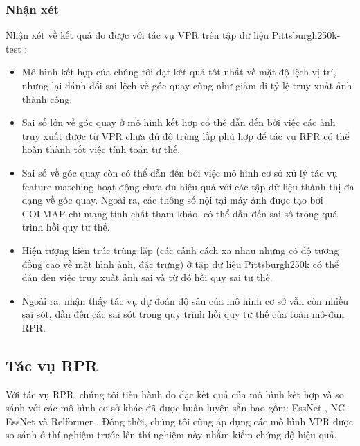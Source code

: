 \subsubsection*{Nhận xét}
Nhận xét về kết quả đo được với tác vụ VPR trên tập dữ liệu Pittsburgh250k-test \cite{6618963}:
\begin{itemize}
	\item Mô hình kết hợp của chúng tôi đạt kết quả tốt nhất về mặt độ lệch vị trí, nhưng lại đánh đổi sai lệch về góc quay cũng như giảm đi tỷ lệ truy xuất ảnh thành công.
	\item Sai số lớn về góc quay ở mô hình kết hợp có thể dẫn đến bởi việc các ảnh truy xuất được từ VPR chưa đủ độ trùng lắp phù hợp để tác vụ RPR có thể hoàn thành tốt việc tính toán tư thế.
	\item Sai số về góc quay còn có thể dẫn đến bởi việc mô hình cơ sở xử lý tác vụ feature matching hoạt động chưa đủ hiệu quả với các tập dữ liệu thành thị đa dạng về góc quay. Ngoài ra, các thông số nội tại máy ảnh được tạo bởi COLMAP chỉ mang tính chất tham khảo, có thể dẫn đến sai số trong quá trình hồi quy tư thế.
	\item Hiện tượng kiến trúc trùng lặp (các cảnh cách xa nhau nhưng có độ tương đồng cao về mặt hình ảnh, đặc trưng) ở tập dữ liệu Pittsburgh250k \cite{6618963} có thể dẫn đến việc truy xuất ảnh sai và từ đó hồi quy sai tư thế.
	\item Ngoài ra, nhận thấy tác vụ dự đoán độ sâu của mô hình cơ sở vẫn còn nhiều sai sót, dẫn đến các sai sót trong quy trình hồi quy tư thế của toàn mô-đun RPR.
\end{itemize}

\subsection*{Tác vụ RPR}

Với tác vụ RPR, chúng tôi tiến hành đo đạc kết quả của mô hình kết hợp và so sánh với các mô hình cơ sở khác đã được huấn luyện sẵn bao gồm: EssNet \cite{zhou2020learn}, NC-EssNet \cite{zhou2020learn} và Relformer \cite{idan2023learning}. Đồng thời, chúng tôi cũng áp dụng các mô hình VPR được so sánh ở thí nghiệm trước lên thí nghiệm này nhằm kiểm chứng độ hiệu quả. 

